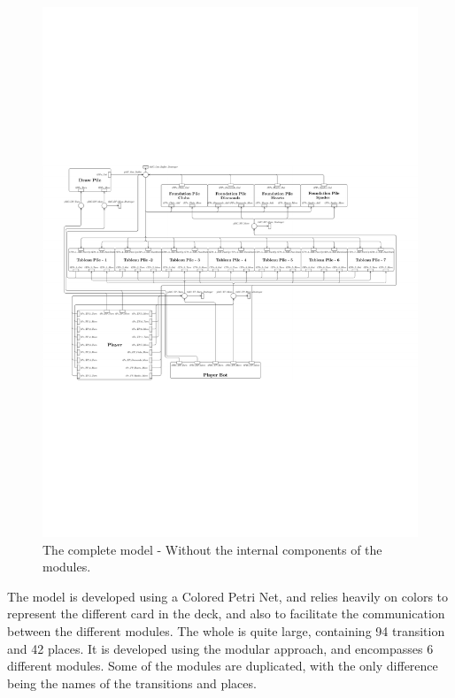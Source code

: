 \documentclass[runningheads,a4paper]{llncs}
\begin{document}
\begin{figure}
	\begin{center} %
		\includegraphics[trim=250 260 230 260,scale=1.1]{images/overallViewPdf}
		\caption{The complete model - Without the internal components of the modules.}
		\label{fig:full_horizontal}
	\end{center}
\end{figure}


The model is developed using a Colored Petri Net, and relies heavily on colors to represent the different card in the deck, and also to facilitate the communication between the different modules. The whole is quite large, containing 94 transition and 42 places. It is developed using the modular approach, and encompasses 6 different modules. Some of the modules are duplicated, with the only difference being the names of the transitions and places.
\clearpage
\end{document}
